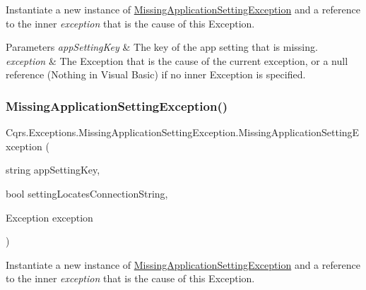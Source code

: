 Instantiate a new instance of \hyperlink{classCqrs_1_1Exceptions_1_1MissingApplicationSettingException}{Missing\+Application\+Setting\+Exception} and a reference to the inner {\itshape exception}  that is the cause of this Exception. 


\begin{DoxyParams}{Parameters}
{\em app\+Setting\+Key} & The key of the app setting that is missing.\\
\hline
{\em exception} & The Exception that is the cause of the current exception, or a null reference (Nothing in Visual Basic) if no inner Exception is specified.\\
\hline
\end{DoxyParams}
\mbox{\label{classCqrs_1_1Exceptions_1_1MissingApplicationSettingException_a716df17e333c4d4360bf235fb3a4dc7e_a716df17e333c4d4360bf235fb3a4dc7e}} 
\subsubsection{\texorpdfstring{Missing\+Application\+Setting\+Exception()}{MissingApplicationSettingException()}\hspace{0.1cm}{\footnotesize\ttfamily [4/4]}}
{\footnotesize\ttfamily Cqrs.\+Exceptions.\+Missing\+Application\+Setting\+Exception.\+Missing\+Application\+Setting\+Exception (\begin{DoxyParamCaption}\item[{string}]{app\+Setting\+Key,  }\item[{bool}]{setting\+Locates\+Connection\+String,  }\item[{Exception}]{exception }\end{DoxyParamCaption})\hspace{0.3cm}{\ttfamily [protected]}}



Instantiate a new instance of \hyperlink{classCqrs_1_1Exceptions_1_1MissingApplicationSettingException}{Missing\+Application\+Setting\+Exception} and a reference to the inner {\itshape exception}  that is the cause of this Exception. 


